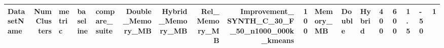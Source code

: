 \begin{tabular}{lrlllrrrrr}
\toprule
DatasetName & NumClusters & metric & baseline & compare_suite & Double_Memory_MB & Hybrid_Memory_MB & Rel_Memory_MB & Improvement_%
\midrule
SYNTH_C_30_F_50_n1000_000k_kmeans & 100 & Memory_MB & Double & Hybrid & 400 & 600 & 1.5 & -50 & 1 \\
\bottomrule
\end{tabular}
